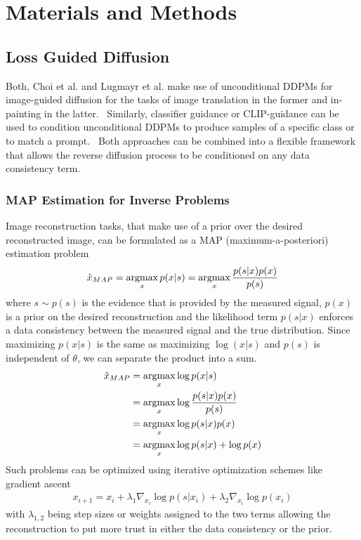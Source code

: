 %
\newpage
\chapter{Materials and Methods}
\section{Loss Guided Diffusion}
Both, Choi et al. and Lugmayr et al. make use of unconditional DDPMs for image-guided diffusion for the tasks of image translation in the former and in-painting in the latter.~\autocite{choi2021ilvr,lugmayr2022repaint} Similarly, classifier guidance or CLIP-guidance can be used to condition unconditional DDPMs to produce samples of a specific class or to match a prompt.~\autocite{dhariwal2021diffusion} Both approaches can be combined into a flexible framework that allows the reverse diffusion process to be conditioned on any data consistency term.

\subsection{MAP Estimation for Inverse Problems}
Image reconstruction tasks, that make use of a prior over the desired reconstructed image, can be formulated as a MAP (maximum-a-posteriori) estimation problem
\begin{equation}
    \hat{x}_{MAP} = \operatorname*{argmax}_x p(x|s) = \operatorname*{argmax}_x \frac{p(s|x)p(x)}{p(s)}
\end{equation}
where $s \sim p(s)$ is the evidence that is provided by the measured signal, $p(x)$ is a prior on the desired reconstruction and the likelihood term $p(s|x)$ enforces a data consistency between the measured signal and the true distribution. Since maximizing $p(x|s)$ is the same as maximizing $\log(x|s)$ and $p(s)$ is independent of $\theta$, we can separate the product into a sum.
\begin{align}
    \hat{x}_{MAP} & = \operatorname*{argmax}_x \log p(x|s)             \\ & = \operatorname*{argmax}_x \log{\frac{p(s|x)p(x)}{p(s)}} \\
                  & = \operatorname*{argmax}_x \log p(s|x)p(x)         \\
                  & = \operatorname*{argmax}_x \log p(s|x) + \log p(x)
\end{align}
Such problems can be optimized using iterative optimization schemes like gradient ascent
\begin{align}
    \label{eq:mapestimation}
    x_{i+1} = x_{i} + \lambda_1 \nabla_{x_i} \log p(s|x_i) + \lambda_2 \nabla_{x_i} \log p(x_i)
\end{align}
with $\lambda_{1,2}$ being step sizes or weights assigned to the two terms allowing the reconstruction to put more trust in either the data consistency or the prior.

